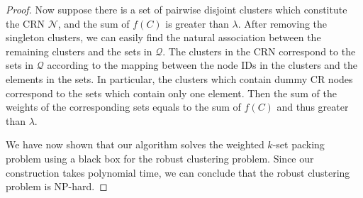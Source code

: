 \documentclass[times]{ettauth}
\newcommand{\ie}{i.e., }
\theoremstyle{mytheoremstyle}
\theoremstyle{mytheoremstyle}
\theoremstyle{mytheoremstyle}
\begin{document}
\begin{proof}
Now suppose there is a set of pairwise disjoint clusters which constitute the CRN $\mathcal{N}$, and the sum of $f(C)$ is greater than $\lambda$.
After removing the singleton clusters, we can easily find the natural association between the remaining clusters and the sets in $\mathcal{Q}$. 
The clusters in the CRN correspond to the sets in $\mathcal{Q}$ according to the mapping between the node IDs in the clusters and the elements in the sets.
In particular, the clusters which contain dummy CR nodes correspond to the sets which contain only one element.
Then the sum of the weights of the corresponding sets equals to the sum of $f(C)$ and thus greater than $\lambda$.




We have now shown that our algorithm solves the weighted $k$-set packing problem using a black box for the robust clustering problem. 
Since our construction takes polynomial time, we can conclude that the robust clustering problem is NP-hard.

\end{proof}
\end{document}
